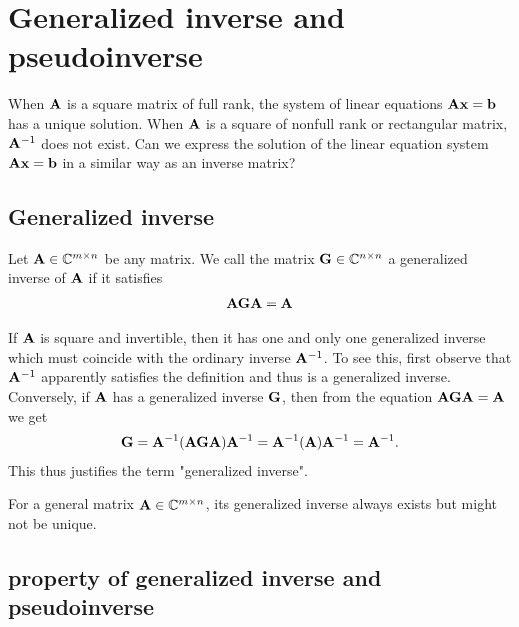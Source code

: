 \section{Generalized inverse and pseudoinverse}
When $\bold{A}$ is a square matrix of full rank, 
the system of linear equations $\bold{Ax}=\bold{b}$ has a unique solution. 
When $\bold{A}$ is a square of nonfull rank or rectangular matrix, 
$\bold{A}^{-1}$ does not exist. Can we express the solution of 
the linear equation system $\bold{Ax}=\bold{b}$ in a similar way as an inverse matrix?
\subsection{Generalized inverse}

\begin{definition}{}{}
    Let $\bold{A}\in\mathbb{C}^{m\times n}$ be any matrix. We call the matrix $\bold{G}\in \mathbb{C}^{n\times n}$ a generalized inverse of $\bold{A}$ if it satisfies
    \begin{align*}
        \bold{AGA}=\bold{A}
    \end{align*} 
\end{definition}

\begin{remark}
    If $\bold{A}$ is square and invertible, then it has one and only one generalized
    inverse which must coincide with the ordinary inverse $\bold{A}^{-1}$.
    To see this, first observe that $\bold{A}^{-1}$ apparently satisfies the definition and thus is a generalized inverse.
    Conversely, if $\bold{A}$ has a generalized inverse $\bold{G}$,
    then from the equation $\bold{AGA}=\bold{A}$ we get 
    \begin{align*}
        \bold{G} = \bold{A}^{-1} (\bold{AGA}) \bold{A}^{-1} = \bold{A}^{-1} (\bold{A}) \bold{A}^{-1} = \bold{A}^{-1}.
    \end{align*}
    This thus justifies the term "generalized inverse".
\end{remark}

\begin{remark}
    For a general matrix $\bold{A}\in \mathbb{C}^{m\times n}$, its generalized inverse always exists but might not be unique.
\end{remark}


\subsection{property of generalized inverse and pseudoinverse}

